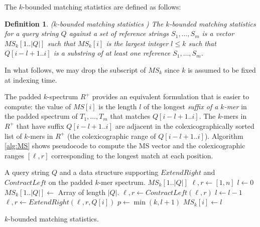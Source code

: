 \documentclass[unnumsec,webpdf,modern,large]{biorxiv}%
\theoremstyle{thmstyleone}%
\theoremstyle{thmstyletwo}%
\theoremstyle{thmstylethree}%
\newtheorem{definition}{Definition}
\begin{document}
The $k$-bounded matching statistics are defined as follows:

\begin{definition}\label{def:k-bounded-ms}
    ($k$-bounded matching statistics \cite{alanko2024finimizers})
    The $k$-bounded matching statistics for a query string $Q$ against a set of reference strings $S_1, \ldots, S_m$ is a vector $MS_k[1..|Q|]$ such that $MS_k[i]$ is the largest integer $l \leq k$ such that $Q[i-l+1..i]$ %
    is a substring of at least one reference $S_1, \ldots, S_m$.
\end{definition}

In what follows, we may drop the subscript of $MS_k$ since $k$ is assumed to be fixed at indexing time.

The padded $k$-spectrum $R^+$ provides an equivalent formulation that is easier to compute: the value of $MS[i]$ is the length $l$ of the longest \emph{suffix of a $k$-mer} in the padded spectrum of $T_1, \ldots, T_m$ that matches $Q[i-l+1..i]$. The $k$-mers in $R^+$ that have suffix $Q[i-l+1..i]$ are adjacent in the colexicographically sorted list of $k$-mers in $R^+$ (the colexicographic range of $Q[i-l+1..i]$). Algorithm \ref{alg:MS} shows pseudocode to compute the MS vector and the colexicographic ranges $[\ell, r]$ corresponding to the longest match at each position.

\begin{algorithm}
\begin{algorithmic}[1]
\small
\Require A query string $Q$ and a data structure supporting $ExtendRight$ and $ContractLeft$ on the padded $k$-mer spectrum. %
\Ensure $MS_k[1..|Q|]$
\State $\ell, r \gets [1,n]$ 
\State $l \gets 0$ 
\State $MS_k[1..|Q|] \gets $ Array of length $|Q|$.
\label{line:MS-1-start}
    \State $\ell, r \gets ContractLeft(\ell, r)$
    \State $l \gets l-1$
\EndWhile \label{line:MS-1-end}
    \State $\ell, r \gets ExtendRight(\ell, r, Q[i])$\label{line:MS-2-start}
    \State $p \gets \min(k, l+1)$\label{line:MS-2-end}
\EndIf
\State $MS_k[i] \gets l$ %
\label{line:MS-4-assignment}
\EndFor
\caption{\small $k$-bounded matching statistics.} 
\label{alg:MS}
\end{algorithmic}
\end{algorithm}
\end{document}
